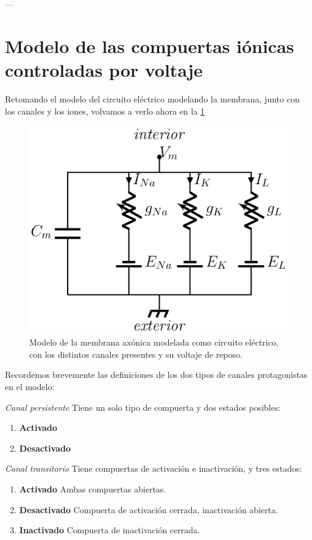 ---

\section{Modelo de las compuertas iónicas controladas por voltaje}

Retomando el modelo del circuito eléctrico modelando la membrana, junto con los canales y los iones, volvamos a verlo ahora en la \ref{fig:circuito1}

\begin{figure}[H]
 \centering
 \includegraphics[scale=0.5]{../Figuras/circuito.png}
 \caption{Modelo de la membrana axónica modelada como circuito eléctrico, con los distintos canales presentes y su voltaje de reposo.}
 \label{fig:circuito1}
\end{figure}

Recordemos brevemente las definiciones de los dos tipos de canales protagonistas en el modelo:

\begin{definition}
 \emph{Canal persistente} Tiene un solo tipo de compuerta y dos estados posibles:
 \begin{enumerate}
  \item \textbf{Activado}
  \item \textbf{Desactivado}
 \end{enumerate}

\end{definition}

\begin{definition}
 \emph{Canal transitorio} Tiene compuertas de activación e inactivación, y tres estados:
 \begin{enumerate}
  \item \textbf{Activado} Ambas compuertas abiertas.
  \item \textbf{Desactivado} Compuerta de activación cerrada, inactivación abierta.
  \item \textbf{Inactivado} Compuerta de inactivación cerrada.
 \end{enumerate}

\end{definition}


